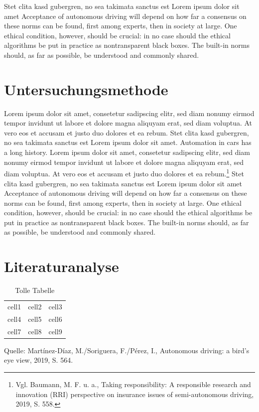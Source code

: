 Stet clita kasd gubergren, no sea takimata sanctus est Lorem ipsum dolor sit amet Acceptance of autonomous driving will depend on how far a consensus on these norms can be found, first among experts, then in society at large. 
One ethical condition, however, should be crucial: in no case should the ethical algorithms be put in practice as nontransparent black boxes. 
The built-in norms should, as far as possible, be understood and commonly shared.
	      	      	      	      	      
\section{Untersuchungsmethode}
	      	      	      	      	      
Lorem ipsum dolor sit amet, consetetur sadipscing elitr, sed diam nonumy eirmod tempor invidunt ut labore et dolore magna aliquyam erat, sed diam voluptua. 
At vero eos et accusam et justo duo dolores et ea rebum. 
Stet clita kasd gubergren, no sea takimata sanctus est Lorem ipsum dolor sit amet. 
Automation in cars has a long history.  Lorem ipsum dolor sit amet, consetetur sadipscing elitr, sed diam nonumy eirmod tempor invidunt ut labore et dolore magna aliquyam erat, sed diam voluptua. 
At vero eos et accusam et justo duo dolores et ea rebum.\footnote{Vgl. Baumann, M. F. u. a., Taking responsibility: A responsible research and innovation (RRI) perspective on insurance issues of semi-autonomous driving, 2019, S. 558.} 
Stet clita kasd gubergren, no sea takimata sanctus est Lorem ipsum dolor sit amet Acceptance of autonomous driving will depend on how far a consensus on these norms can be found, first among experts, then in society at large. 
One ethical condition, however, should be crucial: in no case should the ethical algorithms be put in practice as nontransparent black boxes. 
The built-in norms should, as far as possible, be understood and commonly shared.
	      	      	      	      	      
	      	      	      	      	      
\section{Literaturanalyse}
	      	      	      	      	      
\begin{table}[h]
	\caption{Tolle Tabelle}
	\centering
	\begin{tabular}{ | c | c | c | } 
		\hline
		cell1 & cell2 & cell3 \\ 
		cell4 & cell5 & cell6 \\ 
		cell7 & cell8 & cell9 \\ 
		\hline
	\end{tabular}
	\begin{flushleft}
		Quelle: Martínez-Díaz, M./Soriguera, F./Pérez, I., Autonomous driving: a bird's eye view, 2019, S. 564.	
	\end{flushleft}	
\end{table}
	      	      	      	      	      
